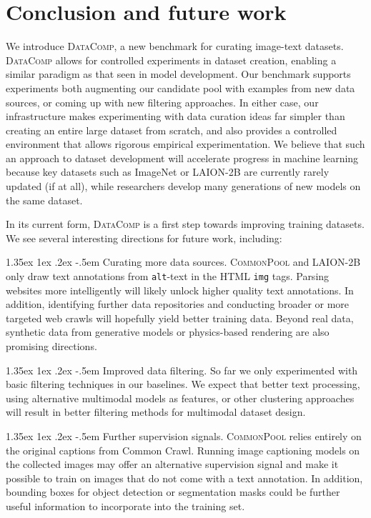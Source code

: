 \documentclass[dvipsnames,11pt]{article}
\makeatletter
\renewcommand\paragraph{\@startsection{paragraph}{4}{\z@}                                     {1.35ex \@plus1ex \@minus.2ex}                                {-.5em}
{\normalfont\normalsize\bfseries}}
\newcommand{\datanet}{\textsc{DataComp}\xspace}
\newcommand{\pool}{\textsc{CommonPool}\xspace}
\makeatother
\begin{document}
\section{Conclusion and future work}
\label{sec:conclusion}

We introduce \datanet, a new benchmark for curating image-text datasets.
\datanet allows for controlled experiments in dataset creation, enabling a similar paradigm as that seen in model development.
Our benchmark supports experiments both augmenting our candidate pool with examples from new data sources, or coming up with new filtering approaches.
In either case, our infrastructure makes experimenting with data curation ideas far simpler than creating an entire large dataset from scratch, and also provides a controlled environment that allows rigorous empirical experimentation.
We believe that such an approach to dataset development will accelerate progress in machine learning because key datasets such as ImageNet or LAION-2B are currently rarely updated (if at all), while researchers develop many generations of new models on the same dataset. 

In its current form, \datanet is a first step towards improving training datasets. We see several interesting directions for future work, including:

\paragraph{Curating more data sources.} \pool and LAION-2B only draw text annotations from \texttt{alt}-text in the HTML \texttt{img} tags.
Parsing websites more intelligently will likely unlock higher quality text annotations.
In addition, identifying further data repositories and conducting broader or more targeted web crawls will hopefully yield better training data.
Beyond real data, synthetic data from generative models or physics-based rendering are also promising directions.

\paragraph{Improved data filtering.} So far we only experimented with basic filtering techniques in our baselines.
We expect that better text processing, using alternative multimodal models as features, or other clustering approaches will result in better filtering methods for multimodal dataset design.

\paragraph{Further supervision signals.} \pool relies entirely on the original captions from Common Crawl.
Running image captioning models on the collected images may offer an alternative supervision signal and make it possible to train on images that do not come with a text annotation.
In addition, bounding boxes for object detection or segmentation masks could be further useful information to incorporate into the training set.
\end{document}
